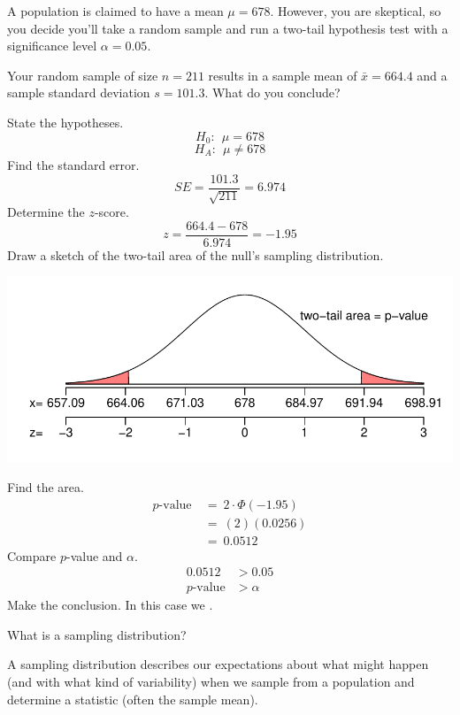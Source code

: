 \documentclass[12pt,letterpaper,addpoints]{exam}
\begin{document}
\begin{questions}
\begin{solution}
\end{solution}

\newpage

\question[10] A population is claimed to have a mean $\mu=678$. However, you are skeptical, so you decide you'll take a random sample and run a two-tail hypothesis test with a significance level $\alpha=0.05$.  

Your random sample of size $n=211$ results in a sample mean of $\bar{x}=664.4$ and a sample standard deviation $s=101.3$. What do you conclude?

\begin{solution}
State the hypotheses.
$$H_0: ~~\mu=678 $$
$$H_A: ~~\mu\ne 678 $$
Find the standard error.
$$SE = \frac{101.3}{\sqrt{211}} = 6.974$$
Determine the $z$-score.
$$z = \frac{664.4-678}{6.974} = -1.95$$
Draw a sketch of the two-tail area of the null's sampling distribution.
\begin{center}
\includegraphics[scale=1]{figures/sketch11.pdf}
\end{center}
Find the area.
\begin{align*}
p\text{-value} ~&=~ 2\cdot\Phi(-1.95)\\
&=~ (2)(0.0256) \\
&=~ 0.0512
\end{align*}
Compare $p$-value and $\alpha$.
\begin{align*}
0.0512 &> 0.05 \\
p\text{-value} &> \alpha
\end{align*}
Make the conclusion. In this case we .
\end{solution}

\newpage
\question[10] What is a sampling distribution?
\begin{solution}
A sampling distribution describes our expectations about what might happen (and with what kind of variability) when we sample from a population and determine a statistic (often the sample mean).
\end{solution}

\end{questions}

%
%
\end{document}
